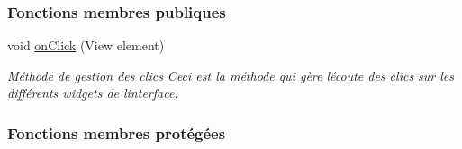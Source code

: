 \subsubsection*{Fonctions membres publiques}
\begin{DoxyCompactItemize}
\item 
void \hyperlink{classcom_1_1lasalle_1_1io__trucks_1_1_main_activity_a154e0d879d71bfbe95bc2d566517589d}{on\+Click} (View element)
\begin{DoxyCompactList}\small\item\em Méthode de gestion des clics Ceci est la méthode qui gère l\textquotesingle{}écoute des clics sur les différents widgets de l\textquotesingle{}interface. \end{DoxyCompactList}\end{DoxyCompactItemize}
\subsubsection*{Fonctions membres protégées}
